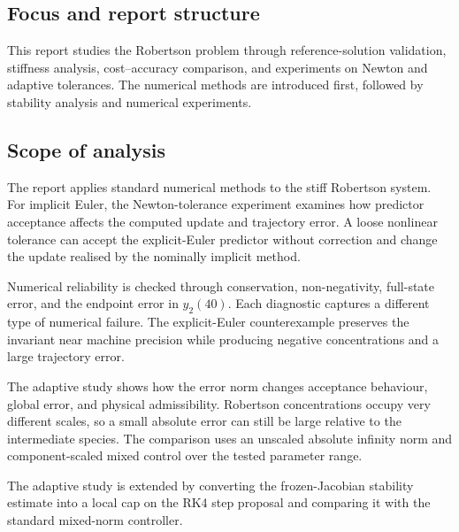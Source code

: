 \subsection{Focus and report structure}
This report studies the Robertson problem through reference-solution validation, stiffness analysis, cost--accuracy comparison, and experiments on Newton and adaptive tolerances. The numerical methods are introduced first, followed by stability analysis and numerical experiments.

\subsection{Scope of analysis}
The report applies standard numerical methods to the stiff Robertson system. For implicit Euler, the Newton-tolerance experiment examines how predictor acceptance affects the computed update and trajectory error. A loose nonlinear tolerance can accept the explicit-Euler predictor without correction and change the update realised by the nominally implicit method.

Numerical reliability is checked through conservation, non-negativity, full-state error, and the endpoint error in $y_2(40)$. Each diagnostic captures a different type of numerical failure. The explicit-Euler counterexample preserves the invariant near machine precision while producing negative concentrations and a large trajectory error.

The adaptive study shows how the error norm changes acceptance behaviour, global error, and physical admissibility. Robertson concentrations occupy very different scales, so a small absolute error can still be large relative to the intermediate species. The comparison uses an unscaled absolute infinity norm and component-scaled mixed control over the tested parameter range.

The adaptive study is extended by converting the frozen-Jacobian stability estimate into a local cap on the RK4 step proposal and comparing it with the standard mixed-norm controller.

